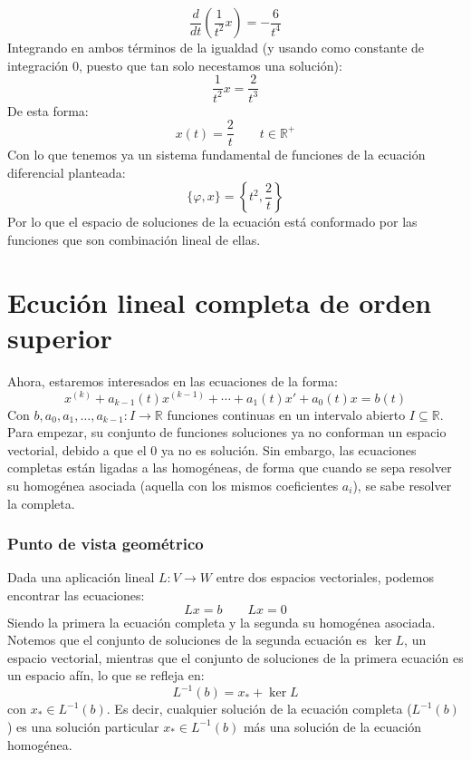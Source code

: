 \begin{ejemplo}
\begin{equation*}
        \dfrac{d}{dt}\left(\dfrac{1}{t^2}x\right) = -\dfrac{6}{t^4}
    \end{equation*}
    Integrando en ambos términos de la igualdad (y usando como constante de integración $0$, puesto que tan solo necestamos una solución):
    \begin{equation*}
        \dfrac{1}{t^2}x = \dfrac{2}{t^3}
    \end{equation*}
    De esta forma:
    \begin{equation*}
        x(t) = \dfrac{2}{t} \qquad t\in \mathbb{R}^+
    \end{equation*}
    Con lo que tenemos ya un sistema fundamental de funciones de la ecuación diferencial planteada:
    \begin{equation*}
        \{\varphi, x\} = \left\{t^2, \dfrac{2}{t}\right\}
    \end{equation*}
    Por lo que el espacio de soluciones de la ecuación está conformado por las funciones que son combinación lineal de ellas.
\end{ejemplo}

\section{Ecución lineal completa de orden superior}
\noindent
Ahora, estaremos interesados en las ecuaciones de la forma:
\begin{equation*}
    x^{(k)} + a_{k-1}(t) x^{(k-1)} + \cdots + a_1(t) x' + a_0(t)x = b(t)
\end{equation*}
Con $b,a_0,a_1,\ldots,a_{k-1}:I\rightarrow\mathbb{R}$ funciones continuas en un intervalo abierto $I\subseteq \mathbb{R}$.\\

Para empezar, su conjunto de funciones soluciones ya no conforman un espacio vectorial, debido a que el 0 ya no es solución. Sin embargo, las ecuaciones completas están ligadas a las homogéneas, de forma que cuando se sepa resolver su homogénea asociada (aquella con los mismos coeficientes $a_i$), se sabe resolver la completa.

\subsubsection{Punto de vista geométrico}
\noindent
Dada una aplicación lineal $L:V\rightarrow W$ entre dos espacios vectoriales, podemos encontrar las ecuaciones:
\begin{equation*}
    Lx = b \qquad Lx = 0
\end{equation*}
Siendo la primera la ecuación completa y la segunda su homogénea asociada. Notemos que el conjunto de soluciones de la segunda ecuación es $\ker L$, un espacio vectorial, mientras que el conjunto de soluciones de la primera ecuación es un espacio afín, lo que se refleja en:
\begin{equation*}
    L^{-1}(b) = x_{\ast} + \ker L
\end{equation*}
con $x_{\ast}\in L^{-1}(b)$. Es decir, cualquier solución de la ecuación completa ($L^{-1}(b)$) es una solución particular $x_\ast\in L^{-1}(b)$ más una solución de la ecuación homogénea.

